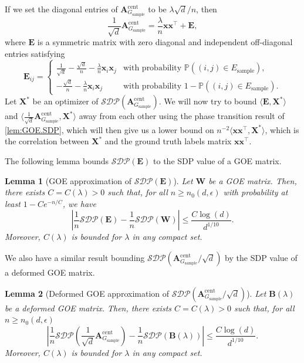 \documentclass[11pt, titlepage]{article} %
\numberwithin{equation}{section}
\newtheorem{lemma}{Lemma}
\theoremstyle{definition}
\numberwithin{theorem}{section}
\numberwithin{lemma}{section}
\numberwithin{corollary}{section}
\numberwithin{proposition}{section}
\numberwithin{definition}{section}
\numberwithin{remark}{section}
\begin{document}
If we set the diagonal entries of $\bm{A}_{G_\mathrm{sample}}^{\mathrm{cent}}$ to be $\lambda \sqrt{d}/n$, then 
\[\frac{1}{\sqrt{d}}\bm{A}_{G_\mathrm{sample}}^{\mathrm{cent}} = \frac{\lambda}{n} \bm{x}\bm{x}^\top + \bm{E},\]
where $\bm{E}$ is a symmetric matrix with zero diagonal and independent off-diagonal entries satisfying
\[\bm{E}_{ij} = \begin{cases}
  \frac{1}{\sqrt{d}} - \frac{\sqrt{d}}{n} - \frac{\lambda}{n} \bm{x}_i\bm{x}_j & \text{with probability } \mathbb{P}((i,j) \in E_\mathrm{sample}), \\
  -\frac{\sqrt{d}}{n} - \frac{\lambda}{n} \bm{x}_i\bm{x}_j & \text{with probability } 1 - \mathbb{P}((i,j) \in E_\mathrm{sample}).
\end{cases}\]
Let $\bm{X}^*$ be an optimizer of $\mathcal{SDP}(\bm{A}_{G_\mathrm{sample}}^{\mathrm{cent}})$. We will now try to bound $\langle \bm{E}, \bm{X}^* \rangle$ and $\langle \frac{1}{\sqrt{d}}\bm{A}_{G_\mathrm{sample}}^{\mathrm{cent}}, \bm{X}^* \rangle$
away from each other using the phase transition result of \cref{lem:GOE.SDP}, which will then give us 
a lower bound on $n^{-2} \langle \bm{x}\bm{x}^\top, \bm{X}^* \rangle$, 
which is the correlation between $\bm{X}^*$ and the ground truth labels matrix $\bm{x}\bm{x}^\top$.

The following lemma bounds $\mathcal{SDP}(\bm{E})$ to the SDP value of a GOE matrix.
\begin{lemma}[GOE approximation of $\mathcal{SDP}(\bm{E})$]
\label{lem:SDP.approx1}
Let $\bm{W}$ be a GOE matrix. Then, there exists $C = C(\lambda) > 0$ such that, for all $n \geq n_0 (d, \epsilon)$
with probability at least $1 - Ce^{-n/C}$, we have
\[
\left|\frac{1}{n} \mathcal{SDP}(\bm{E}) - \frac{1}{n} \mathcal{SDP}(\bm{W})\right| \leq \frac{C\log(d)}{d^{1/10}}.
\]
Moreover, $C(\lambda)$ is bounded for $\lambda$ in any compact set.
\end{lemma}

We also have a similar result bounding $\mathcal{SDP}(\bm{A}_{G_\mathrm{sample}}^{\mathrm{cent}}/\sqrt{d})$
by the SDP value of a deformed GOE matrix.
\begin{lemma}[Deformed GOE approximation of $\mathcal{SDP}(\bm{A}_{G_\mathrm{sample}}^{\mathrm{cent}}/\sqrt{d})$]
\label{lem:SDP.approx2}
Let $\bm{B}(\lambda)$ be a deformed GOE matrix. Then, there exists $C = C(\lambda) > 0$ such that, for all $n \geq n_0 (d, \epsilon)$
\[
\left|\frac{1}{n} \mathcal{SDP}\left(\frac{1}{\sqrt{d}}\bm{A}_{G_\mathrm{sample}}^{\mathrm{cent}}\right) - \frac{1}{n} \mathcal{SDP}(\bm{B}(\lambda))\right| \leq \frac{C\log(d)}{d^{1/10}}.
\]
Moreover, $C(\lambda)$ is bounded for $\lambda$ in any compact set.
\end{lemma}
\end{document}
